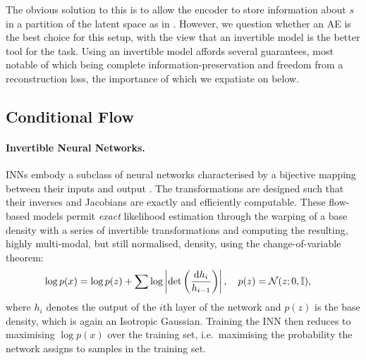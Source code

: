 The obvious solution to this is to allow the encoder to store information about $s$ in a partition
of the latent space as in  \citet{creager2019flexibly}. 
%
However, we question whether an \ac{AE} is the best choice for this setup, with the view that an
invertible model is the better tool for the task. 
%
Using an invertible model affords several guarantees, most notable of which being complete
information-preservation and freedom from a reconstruction loss, the importance of which we
expatiate on below.

\subsection{Conditional Flow}\label{cflow}
%
\paragraph{Invertible Neural Networks.}
%
\Acp{INN} embody a subclass of neural networks characterised by a bijective mapping between their
inputs and output \citep{Dinh2014}. 
%
The transformations are designed such that their inverses and Jacobians are exactly and efficiently
computable.
%
These flow-based models permit \emph{exact} likelihood estimation \citep{normflows2015} through the
warping of a base density with a series of invertible transformations and computing the resulting,
highly multi-modal, but still normalised, density, using the change-of-variable theorem:
%
\begin{align}
\begin{split}
  \log p(x) &= \log p(z) + 
   \sum \log \left| \det\left( \frac{\diff h_i}{ h_{i-1}}\right) \right|, %
  \quad p(z) = \gN(z; 0, \sI),
  \label{eq:changeofvariables}
\end{split}
\end{align}
%
where $h_i$ denotes the output of the \(i\)th layer of the network and $p(z)$ is the base density,
which is again an Isotropic Gaussian. 
%
Training the \ac{INN} then reduces to maximising $\log p(x)$ over the training set, i.e.\ maximising the
probability the network assigns to samples in the training set.
%
